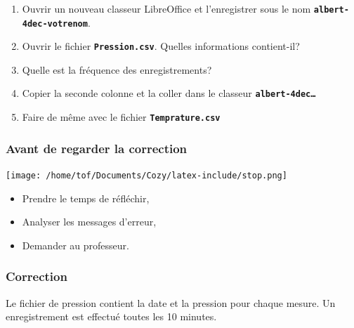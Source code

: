 \documentclass[svgnames,11pt]{beamer}
\begin{document}
\begin{frame}
    \frametitle{}

\begin{activite}
\begin{enumerate}
    \item Ouvrir un nouveau classeur LibreOffice et l'enregistrer sous le nom \textbf{\texttt{albert-4dec-votrenom}}.
    \item Ouvrir le fichier \textbf{\texttt{Pression.csv}}. Quelles informations contient-il?
    \item Quelle est la fréquence des enregistrements?
    \item Copier la seconde colonne et la coller dans le classeur \textbf{\texttt{albert-4dec\dots}}
    \item Faire de même avec le fichier \textbf{\texttt{Temprature.csv}}
\end{enumerate}
\end{activite}
\end{frame}
\begin{frame}
    \frametitle{Avant de regarder la correction}
\begin{center}
    \centering
    \texttt{[image: /home/tof/Documents/Cozy/latex-include/stop.png]}
    \end{center}
{\Large
    \begin{itemize}
        \item Prendre le temps de réfléchir,
        \item Analyser les messages d'erreur,
        \item Demander au professeur.
    \end{itemize}
}
\end{frame}
\begin{frame}
    \frametitle{Correction}
    Le fichier de pression contient la date et la pression pour chaque mesure. Un enregistrement est effectué toutes les 10 minutes.

    

\end{frame}
\end{document}
